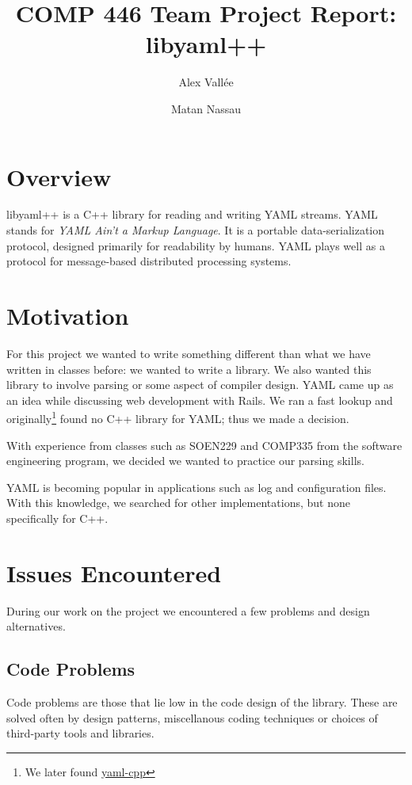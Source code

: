 \documentclass{article}
\author{Alex Vall\'ee \and Matan Nassau}
\title{COMP 446 Team Project Report:  libyaml++}
\begin{document}
\maketitle

\tableofcontents
\pagebreak

\section{Overview}
libyaml++ is a C++ library for reading and writing YAML streams.  YAML stands
for \emph{YAML Ain't a Markup Language}.  It is a portable data-serialization
protocol, designed primarily for readability by humans.  YAML plays well as a
protocol for message-based distributed processing systems.

\section{Motivation}
For this project we wanted to write something different than what we have 
written in classes before:  we wanted to write a library.  We also wanted this 
library to involve parsing or some aspect of compiler design.  YAML came up as 
an idea while discussing web development with Rails.  We ran a fast lookup and 
originally\footnote{We later found 
\href{http://code.google.com/p/yaml-cpp/}{yaml-cpp} } found no C++ library 
for YAML;  thus we made a decision.

With experience from classes such as SOEN229 and COMP335 from the software
engineering program, we decided we wanted to practice our parsing skills.

YAML is becoming popular in applications such as log and configuration files.
With this knowledge, we searched for other implementations, but none
specifically for C++.

\section{Issues Encountered}
During our work on the project we encountered a few problems and design alternatives.

\subsection{Code Problems}
Code problems are those that lie low in the code design of the library.  These 
are solved often by design patterns, miscellanous coding techniques or choices 
of third-party tools and libraries.
\end{document}
